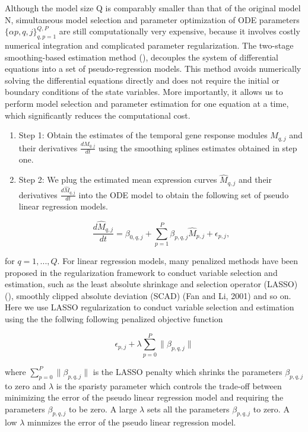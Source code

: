 Although the model size Q is comparably smaller than that of the original model N, simultaneous model selection and parameter optimization of ODE parameters $\{\alpha{p,q,j}\}_{q,p=1}^{Q,P}$ are still computationally very expensive, because it involves costly numerical integration and complicated parameter regularization. The two-stage smoothing-based estimation method (\cite{voit2004decoupling,liang2008parameter}), decouples the system of differential equations into a set of pseudo-regression models.  This method avoids numerically solving the differential equations directly and does not require the initial or boundary conditions of the state variables. More importantly, it allows us to perform model selection and parameter estimation for one equation at a time, which significantly reduces the computational cost.



\begin{enumerate}

   \item Step 1: Obtain the estimates of the temporal gene response modules $M_{q,j}$ and their derivatives $\frac{dM_{q,j}}{dt}$ using the smoothing splines estimates obtained in step one.
   \item Step 2: We plug the estimated mean expression curves $\hat{M}_{q,j}$ and their derivatives $\frac{d\hat{M}_{q,j}}{dt}$ into the ODE model to obtain the following set of pseudo linear regression models.

    \begin{equation} \frac{d\hat{M}_{q,j}}{dt} = \beta_{0,q,j} + \sum_{p=1}^{P} \beta_{p,q,j}\hat{M}_{p,j} + \epsilon_{p,j}, \end{equation}
\end{enumerate}

for $q=1,...,Q$. For linear regression models, many penalized methods have been proposed in the regularization framework to conduct variable selection and estimation, such as the least absolute shrinkage and selection operator (LASSO) (\cite{tibshirani1996regression}), smoothly clipped absolute deviation (SCAD) (Fan and Li, 2001) and so on. Here we use LASSO regularization to conduct variable selection and estimation using the the follwing following penalized objective function

\begin{equation} \epsilon_{p,j} + \lambda \sum_{p=0}^{P} \| \beta_{p,q,j} \| \end{equation}

where $\sum_{p=0}^{P} \| \beta_{p,q,j} \|$ is the LASSO penalty which shrinks the parameters $\beta_{p,q,j}$ to zero and $\lambda$ is the sparisty parameter which controls the trade-off between minimizing the error of the pseudo linear regression model and requiring the parameters $\beta_{p,q,j}$ to be zero. A large $\lambda$ sets all the parameters $\beta_{p,q,j}$ to zero. A low $\lambda$ minmizes the error of the pseudo linear regression model.

